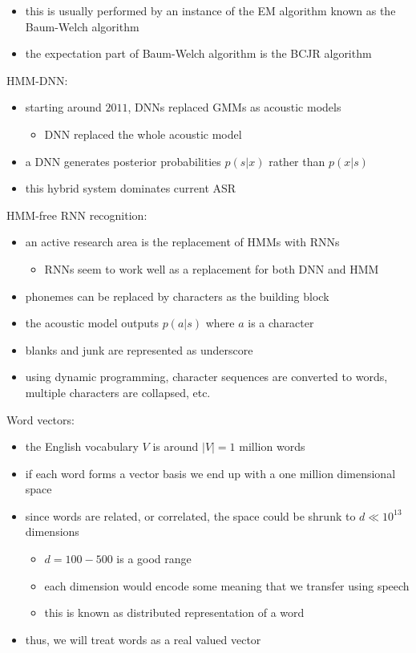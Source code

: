 \documentclass[onecolumn]{IEEEtran}
\newcommand{\bi}{\begin{itemize}}
\newcommand{\ei}{\end{itemize}}
\begin{document}
\begin{itemize}
        \bi
            \item this is usually performed by an instance of the EM algorithm known as the Baum-Welch algorithm
            \item the expectation part of Baum-Welch algorithm is the BCJR algorithm
        \ei
    \ei
    \item HMM-DNN:
    \bi
        \item starting around $2011$, DNNs replaced GMMs as acoustic models
        \bi
            \item DNN replaced the whole acoustic model
        \ei
        \item a DNN generates posterior probabilities $p(s|x)$ rather than $p(x|s)$
        \item this hybrid system dominates current ASR
    \ei
    \item HMM-free RNN recognition:
    \bi
        \item an active research area is the replacement of HMMs with RNNs
        \bi
            \item RNNs seem to work well as a replacement for both DNN and HMM
        \ei
        \item phonemes can be replaced by characters as the building block
        \item the acoustic model outputs $p(a|s)$ where $a$ is a character
        \item blanks and junk are represented as underscore
        \item using dynamic programming, character sequences are converted to words, multiple characters are collapsed, etc.
    \ei
    \item Word vectors:
    \bi
        \item the English vocabulary $V$ is around $|V| = 1$ million words
        \item if each word forms a vector basis we end up with a one million dimensional space
        \item since words are related, or correlated, the space could be shrunk to $d \ll 10^{13}$ dimensions
        \bi
            \item $d = 100-500$ is a good range
            \item  each dimension would encode some meaning that we transfer using speech
            \item this is known as distributed representation of a word
        \ei
        \item thus, we will treat words as a real valued vector

\end{itemize}
\end{document}
